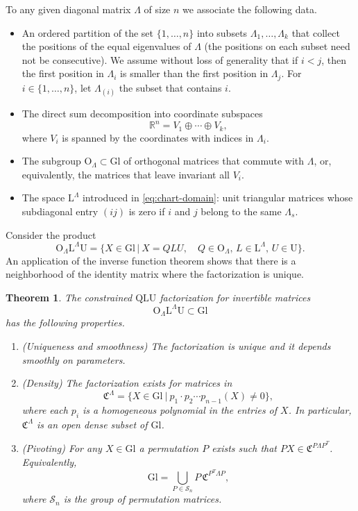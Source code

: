 \documentclass[reqno]{amsart}
\newcommand{\cS}{\mathcal{S}}
\newcommand{\R}{\mathbb{R}}
\newcommand{\Gl}{\mathrm{Gl}}
\newcommand{\So}{\mathrm{So}}
\renewcommand{\L}{\mathrm{L}}
\newcommand{\U}{\mathrm{U}}
\newtheorem{theorem}{Theorem}
\theoremstyle{definition} %
\begin{document}
To any given  diagonal matrix $\Lambda$ of size $n$ we associate the following data.
\begin{itemize}
 \item
An ordered partition of the  set
$\{1,\dots,n\}$ into subsets $\Lambda_{1},\dots,\Lambda_{k}$ that collect the positions of the equal eigenvalues of $\Lambda$ (the positions on each subset need not be consecutive). We assume  without loss of generality that if  $i<j$, then the first position in $\Lambda_{i}$ is smaller than the first position in $\Lambda_{j}$. For  $i\in \{1,\dots,n\}$, let $\Lambda_{(i)}$ the subset that contains $i$.
 \item The direct sum decomposition  into coordinate subspaces
\[\R^n=V_{1}\oplus\cdots \oplus V_{k},\]
where $V_{i}$ is spanned by the coordinates with indices in $\Lambda_{i}$.
\item The subgroup $\mathrm{O}_\Lambda\subset \Gl$ of orthogonal matrices that commute with $\Lambda$, or, equivalently, the matrices that leave invariant all $V_i$.
\item The space $\L^\Lambda$  introduced in \eqref{eq:chart-domain}:  unit triangular matrices whose subdiagonal entry  $(ij)$ is zero if $i$ and $j$ belong to the same $\Lambda_{s}$.
\end{itemize}

%

Consider the product 
\[\mathrm{O}_\Lambda\L^\Lambda \U=\{X\in \Gl\,|\ X=QLU,\quad Q\in\mathrm{O}_\Lambda,\,L\in \L^\Lambda,\,U\in \U\}.\]
An application of the inverse function theorem shows that there is a neighborhood of the identity matrix  where the factorization is unique.



\begin{theorem}\label{thm:constrained-QLU-detailed} The constrained $\mathrm{Q}\L\U$ factorization for invertible matrices
 \[\mathrm{O}_\Lambda\L^\Lambda \U\subset \Gl\]
has the following properties.
\begin{enumerate}
 \item (Uniqueness and smoothness) The factorization is unique and it depends smoothly on parameters.
 \item (Density) The factorization exists for matrices  in
 \[\mathfrak{C}^{\Lambda}=\{X\in \Gl\ |\  p_1\cdot p_2\cdots p_{n-1}(X)\neq 0\},\]
 where each $p_i$ is a homogeneous polynomial in the entries of $X$. In particular, $\mathfrak{C}^{\Lambda}$ is an open dense subset of $\Gl$.
 \item (Pivoting) For any $X\in \Gl$ a permutation $P$ exists such that $PX\in \mathfrak{C}^{P\Lambda P^T}$. Equivalently,
 \[\Gl=\bigcup_{P\in \cS_n}P\, \mathfrak{C}^{P^T\Lambda P},\]
 where $\cS_n$ is the group of permutation matrices.
 \end{enumerate}
\end{theorem}
\end{document}
